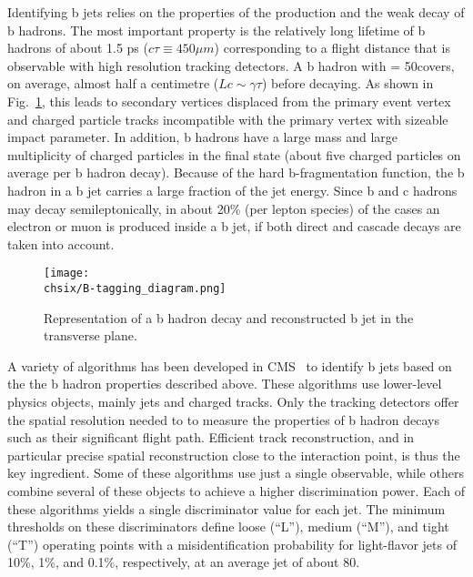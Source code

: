 Identifying b jets relies on the properties of the production and the weak decay of b hadrons. The most important property is the relatively long lifetime of b hadrons of about 1.5 ps ($c\tau \equiv 450\mu m$) corresponding to a flight distance that is observable with high resolution tracking detectors. A b hadron with \pt = 50\GeV covers, on average, almost half a centimetre ($Lc \sim \gamma\tau$) before decaying. As shown in Fig.~\ref{fig:bjet}, this leads to secondary vertices displaced from the primary event vertex and charged particle tracks incompatible with the primary vertex with sizeable impact parameter. In addition, b hadrons have a large mass and large multiplicity of charged particles in the final state (about five charged particles on average per b hadron decay). Because of the hard b-fragmentation function, the b hadron in a b jet carries a large fraction of the jet energy. Since b and c hadrons may decay semileptonically, in about 20\% (per lepton species) of the cases an electron or muon is produced inside a b jet, if both direct and cascade decays are taken into account.

\begin{figure}[!htb]
 \begin{center}
  \texttt{[image: \\chsix/B-tagging\_diagram.png]}
 \end{center}
 \caption{Representation of a b hadron decay and reconstructed b jet in the transverse plane.}
 \label{fig:bjet}
\end{figure}

A variety of algorithms has been developed in CMS~\cite{Chatrchyan:2012jua} to identify b jets based on the the b hadron properties described above. These algorithms use lower-level physics objects, mainly jets and charged tracks. Only the tracking detectors offer the spatial resolution needed to to measure the properties of b hadron decays such as their significant flight path. Efficient track reconstruction, and in particular precise spatial reconstruction close to the interaction point, is thus the key ingredient. 
Some of these algorithms use just a single observable, while others combine several of these objects to achieve a higher discrimination power. Each of these algorithms yields a single discriminator value for each jet. The minimum thresholds on these discriminators define loose (``L''), medium (``M''), and tight (``T'') operating points with a misidentification probability for light-flavor jets of 10\%, 1\%, and 0.1\%, respectively, at an average jet \pt of about 80\GeV.

